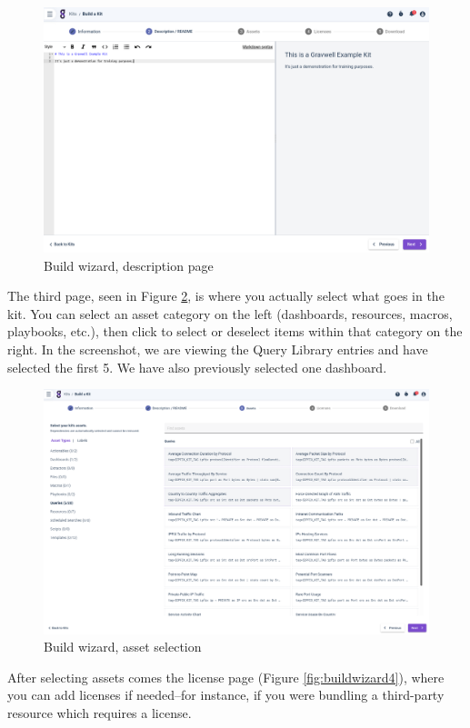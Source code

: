 \begin{figure}[H]
	\includegraphics[width=0.8\linewidth]{images/buildwizard2.png}
	\caption{Build wizard, description page}
	\label{fig:buildwizard2}
\end{figure}

The third page, seen in Figure \ref{fig:buildwizard3}, is where you actually select what goes in the kit. You can select an asset category on the left (dashboards, resources, macros, playbooks, etc.), then click to select or deselect items within that category on the right. In the screenshot, we are viewing the Query Library entries and have selected the first 5. We have also previously selected one dashboard.

\begin{figure}[H]
	\includegraphics[width=0.8\linewidth]{images/buildwizard3.png}
	\caption{Build wizard, asset selection}
	\label{fig:buildwizard3}
\end{figure}

After selecting assets comes the license page (Figure \ref{fig:buildwizard4}), where you can add licenses if needed--for instance, if you were bundling a third-party resource which requires a license.

